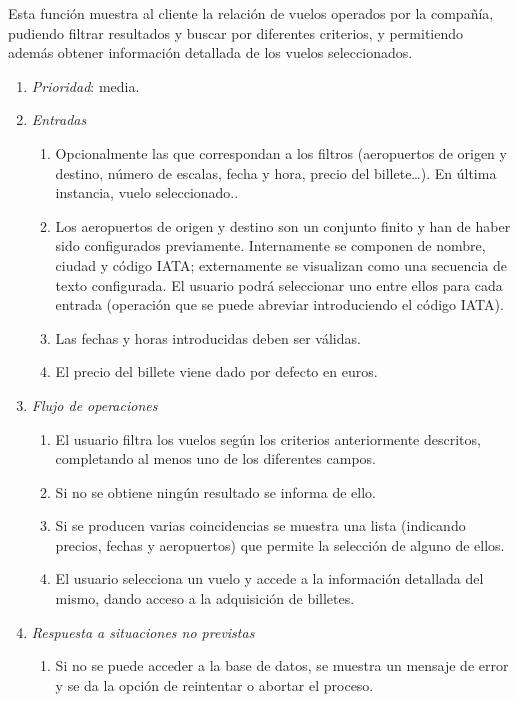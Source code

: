 

	Esta función muestra al cliente la relación de vuelos operados por la compañía, pudiendo filtrar resultados y buscar por diferentes criterios, y permitiendo además obtener información detallada de los vuelos seleccionados.
	
	\begin{enumerate}
		\item \textit{Prioridad}: media.
		\item \textit{Entradas}
		\begin{enumerate}
			\item Opcionalmente las que correspondan a los filtros (aeropuertos de origen y destino, número de escalas, fecha y hora, precio del billete\ldots). En última instancia, vuelo seleccionado..
			\item Los aeropuertos de origen y destino son un conjunto finito y han de haber sido configurados previamente. Internamente se componen de nombre, ciudad y código \gls{IATA}; externamente se visualizan como una secuencia de texto configurada. El usuario podrá seleccionar uno entre ellos para cada entrada (operación que se puede abreviar introduciendo el código IATA).
			\item Las fechas y horas introducidas deben ser válidas.
			\item El precio del billete viene dado por defecto en euros.
		\end{enumerate}
		\item \textit{Flujo de operaciones}
		\begin{enumerate}
			\item El usuario filtra los vuelos según los criterios anteriormente descritos, completando al menos uno de los diferentes campos.
			\item Si no se obtiene ningún resultado se informa de ello. 
			\item Si se producen varias coincidencias se muestra una lista (indicando precios, fechas y aeropuertos) que permite la selección de alguno de ellos.
			\item El usuario selecciona un vuelo y accede a la información detallada del mismo, dando acceso a la adquisición de billetes.
		\end{enumerate}
		\item \textit{Respuesta a situaciones no previstas}
		\begin{enumerate}
			\item Si no se puede acceder a la base de datos, se muestra un mensaje de error y se da la opción de reintentar o abortar el proceso.
		\end{enumerate}
	\end{enumerate}
